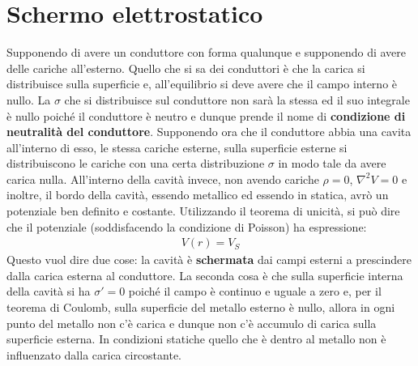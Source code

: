 \documentclass[a4paper, oneside]{article}
\begin{document}
\section{Schermo elettrostatico}
Supponendo di avere un conduttore con forma qualunque e supponendo di avere delle
cariche all'esterno. Quello che si sa dei conduttori è che la carica si distribuisce
sulla superficie e, all'equilibrio si deve avere che il campo interno è nullo. La
$\sigma$ che si distribuisce sul conduttore non sarà la stessa ed il suo integrale
è nullo poiché il conduttore è neutro e dunque prende il nome di \textbf{condizione di neutralità 
del conduttore}. Supponendo ora che il conduttore abbia una cavita all'interno di esso,
le stessa cariche esterne, sulla superficie esterne si distribuiscono le cariche 
con una certa distribuzione $\sigma$ in modo tale da avere carica nulla. All'interno 
della cavità invece, non avendo cariche $\rho = 0$, $\nabla^{2} V = 0$ e inoltre, il bordo 
della cavità, essendo metallico ed essendo in statica, avrò un potenziale ben definito e costante. 
Utilizzando il teorema di unicità, si può dire che  il potenziale (soddisfacendo 
la condizione di Poisson) ha espressione:
\begin{gather*}
    V(r) = V_S
\end{gather*}
Questo vuol dire due cose: la cavità è \textbf{schermata} dai campi esterni a prescindere
dalla carica esterna al conduttore. La seconda cosa è che sulla superficie interna 
della cavità si ha $\sigma' = 0$ poiché il campo è continuo e uguale a zero e, per il teorema 
di Coulomb, sulla superficie del metallo esterno è nullo, allora in ogni punto del metallo 
non c'è carica e dunque non c'è accumulo di carica sulla superficie esterna. In condizioni statiche quello che è dentro
al metallo non è influenzato dalla carica circostante.
\end{document}
